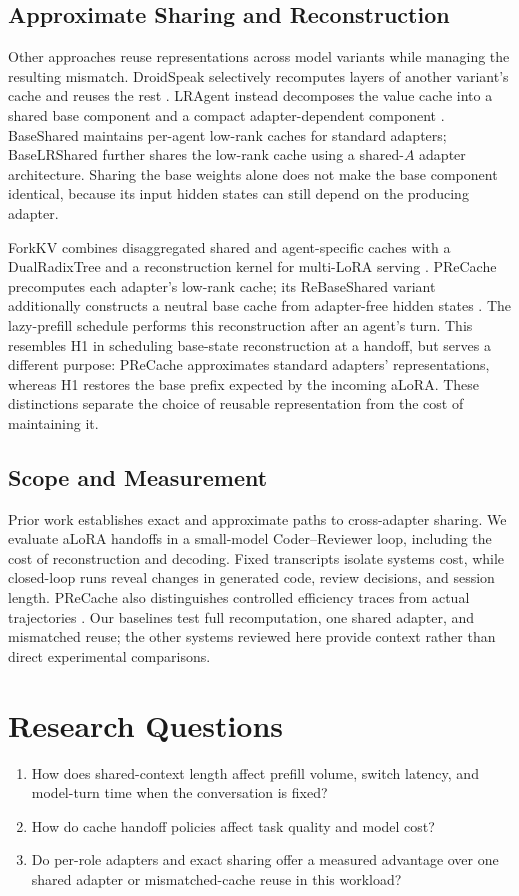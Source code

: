 \documentclass[10pt,twocolumn,letterpaper]{article}
\begin{document}
\subsection{Approximate Sharing and Reconstruction}
Other approaches reuse representations across model variants while managing
the resulting mismatch. DroidSpeak selectively recomputes layers of another
variant's cache and reuses the rest \cite{liu2026droidspeak}. LRAgent instead
decomposes the value cache into a shared base component and a compact
adapter-dependent component \cite{jeon2026lragent}. BaseShared maintains
per-agent low-rank caches for standard adapters; BaseLRShared further shares
the low-rank cache using a shared-$A$ adapter architecture. Sharing the base
weights alone does not make the base component identical, because its input
hidden states can still depend on the producing adapter.

ForkKV combines disaggregated shared and agent-specific caches with a
DualRadixTree and a reconstruction kernel for multi-LoRA serving
\cite{wang2026forkkv}. PReCache precomputes each adapter's low-rank cache;
its ReBaseShared variant additionally constructs a neutral base cache from
adapter-free hidden states \cite{jeon2026precache}. The lazy-prefill schedule
performs this reconstruction after an agent's turn. This resembles H1 in
scheduling base-state reconstruction at a handoff, but serves a different
purpose: PReCache approximates standard adapters' representations, whereas
H1 restores the base prefix expected by the incoming aLoRA. These distinctions
separate the choice of reusable representation from the cost of maintaining it.

\subsection{Scope and Measurement}
Prior work establishes exact and approximate paths to cross-adapter sharing.
We evaluate aLoRA handoffs in a small-model Coder--Reviewer loop, including
the cost of reconstruction and decoding. Fixed transcripts isolate systems
cost, while closed-loop runs reveal changes in generated code, review
decisions, and session length. PReCache also distinguishes controlled
efficiency traces from actual trajectories \cite{jeon2026precache}.
Our baselines test full recomputation, one shared adapter, and mismatched
reuse; the other systems reviewed here provide context rather than direct
experimental comparisons.

\section{Research Questions}
\begin{enumerate}
  \item How does shared-context length affect prefill volume, switch latency,
    and model-turn time when the conversation is fixed?
  \item How do cache handoff policies affect task quality and model cost?
  \item Do per-role adapters and exact sharing offer a measured advantage
    over one shared adapter or mismatched-cache reuse in this workload?
\end{enumerate}
\end{document}
